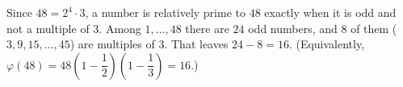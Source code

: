 Since $48=2^4\cdot3$, a number is relatively prime to $48$ exactly when it is odd and not a multiple of $3$. Among $1,\dots,48$ there are $24$ odd numbers, and $8$ of them ($3,9,15,\dots,45$) are multiples of $3$. That leaves $24-8=\boxed{16}$. (Equivalently, $\varphi(48)=48\left(1-\dfrac{1}{2}\right)\left(1-\dfrac{1}{3}\right)=16$.)

